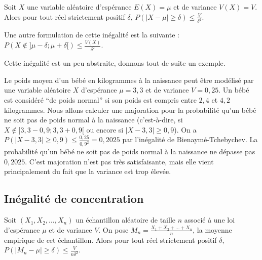 	\begin{formula}
		Soit $X$ une variable aléatoire d'espérance $E(X) = \mu$ et de variance $V(X) = V$. Alors pour tout réel strictement positif $\delta$, $P(|X-\mu| \geq \delta) \leq \frac{V}{\delta^2}$.
	\end{formula}
	
	\begin{tip}
		Une autre formulation de cette inégalité est la suivante : $P(X \notin ]\mu - \delta; \mu + \delta[) \leq \frac{V(X)}{\delta^2}$.
	\end{tip}
	
	\begin{nosummary}
		Cette inégalité est un peu abstraite, donnons tout de suite un exemple.
		
		\begin{tip}[Exemple]
			Le poids moyen d'un bébé en kilogrammes à la naissance peut être modélisé par une variable aléatoire $X$ d'espérance $\mu = 3,3$ et de variance $V = 0,25$.
			\newpar
			Un bébé est considéré ``de poids normal'' si son poids est compris entre $2,4$ et $4,2$ kilogrammes. Nous allons calculer une majoration pour la probabilité qu'un bébé ne soit pas de poids normal à la naissance (c'est-à-dire, si $X \notin ]3,3 - 0,9; 3,3 + 0,9[$ ou encore si $|X - 3,3| \geq 0,9$).
			\newpar
			On a $P(|X - 3,3| \geq 0,9) \leq \frac{0,25}{0,9^2} = 0,2025$ par l'inégalité de Bienaymé-Tchebychev.
			\newpar
			La probabilité qu'un bébé ne soit pas de poids normal à la naissance ne dépasse pas $0,2025$.
			\newpar
			C'est majoration n'est pas très satisfaisante, mais elle vient principalement du fait que la variance est trop élevée.
		\end{tip}
	\end{nosummary}
	
	\subsection{Inégalité de concentration}
	
	\begin{formula}
		Soit $(X_1, X_2, \dots, X_n)$ un échantillon aléatoire de taille $n$ associé à une loi d'espérance $\mu$ et de variance $V$. On pose $M_n = \frac{X_1 + X_2 + \dots + X_n}{n}$, la moyenne empirique de cet échantillon.
		\newpar
		Alors pour tout réel strictement positif $\delta$, $P(|M_n - \mu| \geq \delta) \leq \frac{V}{n \delta^2}$.
	\end{formula}
	
